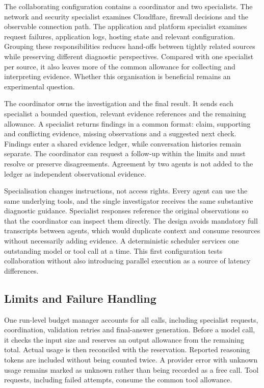The collaborating configuration contains a coordinator and two
specialists. The network and security specialist examines Cloudflare,
firewall decisions and the observable connection path. The application
and platform specialist examines request failures, application logs,
hosting state and relevant configuration. Grouping these responsibilities
reduces hand-offs between tightly related sources while preserving
different diagnostic perspectives. Compared with one specialist per
source, it also leaves more of the common allowance for collecting and
interpreting evidence. Whether this organisation is beneficial remains
an experimental question.

The coordinator owns the investigation and the final result. It sends each
specialist a bounded question, relevant evidence references and the
remaining allowance. A specialist returns findings in a common format:
claim, supporting and conflicting evidence, missing observations and a
suggested next check. Findings enter a shared evidence ledger, while
conversation histories remain separate. The coordinator can request a
follow-up within the limits and must resolve or preserve disagreements.
Agreement by two agents is not added to the ledger as independent
observational evidence.

Specialisation changes instructions, not access rights. Every agent can
use the same underlying tools, and the single investigator receives the
same substantive diagnostic guidance. Specialist responses reference the
original observations so that the coordinator can inspect them directly.
The design avoids mandatory full transcripts between agents, which would
duplicate context and consume resources without necessarily adding
evidence. A deterministic scheduler services one outstanding model or
tool call at a time. This first configuration tests collaboration without
also introducing parallel execution as a source of latency differences.

\subsection{Limits and Failure Handling}

One run-level budget manager accounts for all calls, including specialist
requests, coordination, validation retries and final-answer generation.
Before a model call, it checks the input size and reserves an output
allowance from the remaining total. Actual usage is then reconciled with
the reservation. Reported reasoning tokens are included without being
counted twice. A provider error with unknown usage remains marked as
unknown rather than being recorded as a free call. Tool requests, including
failed attempts, consume the common tool allowance.

